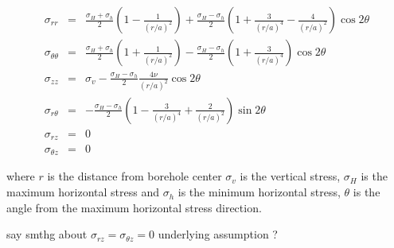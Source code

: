 \begin{mdframed}[backgroundcolor=blue!5]
\begin{eqnarray}
\sigma_{rr} &=& 
\frac{\sigma_H+\sigma_h}{2} \left(1-\frac{1}{(r/a)^2} \right)
+\frac{\sigma_H-\sigma_h}{2}  \left( 1 + \frac{3}{(r/a)^4} 
- \frac{4}{(r/a)^2}   \right) \cos 2\theta   \label{f185k1}\\
\sigma_{\theta\theta}&=& 
\frac{\sigma_H+\sigma_h}{2} \left(1+\frac{1}{(r/a)^2} \right)
-\frac{\sigma_H-\sigma_h}{2} \left( 1 + \frac{3}{(r/a)^4}   \right) \cos 2\theta   \label{f185k2}\\
\sigma_{zz} &=& \sigma_v -  \frac{\sigma_H-\sigma_h}{2}   \frac{4 \nu}{(r/a)^2}  
\cos 2\theta \label{f185k234}
\\
\sigma_{r\theta} &=&
-\frac{\sigma_H-\sigma_h}{2}  \left( 1 -  \frac{3}{(r/a)^4} + \frac{2}{(r/a)^2} \right) \sin 2\theta 
\\
\sigma_{rz} &=& 0 \\
\sigma_{\theta z} &=& 0 
\end{eqnarray}
\end{mdframed}
where 
$r$ is the distance from borehole center
$\sigma_v$ is the vertical stress, 
$\sigma_H$ is the maximum horizontal stress
and $\sigma_h$ is the minimum horizontal stress,
$\theta$ is the angle from the maximum horizontal stress direction.

{\color{red} say smthg about $\sigma_{rz}=\sigma_{\theta z}=0$ underlying assumption ?}


